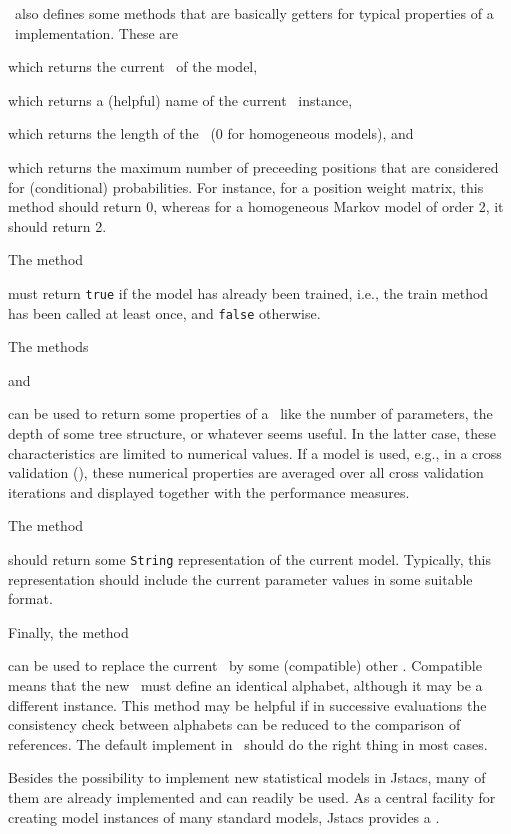 \TrainSM~also defines some methods that are basically getters for typical properties of a \TrainSM~implementation. 
These are
\addtocounter{off}{10}
which returns the current \AlphabetContainer~of the model,
\addtocounter{off}{7}
which returns a (helpful) name of the current \TrainSM~instance,
\addtocounter{off}{10}
which returns the length of the \TrainSM~(0 for homogeneous models), and
\addtocounter{off}{10}
which returns the maximum number of preceeding positions that are considered for (conditional) probabilities.
For instance, for a position weight matrix, this method should return 0, whereas for a homogeneous Markov model of order 2, it should return 2.

The method
\addtocounter{off}{9}
must return \lstinline+true+ if the model has already been trained, i.e., the train method has been called at least once, and \lstinline+false+ otherwise.

The methods
\addtocounter{off}{17}
and
\addtocounter{off}{12}
can be used to return some  properties of a \TrainSM~like the number of parameters, the depth of some tree structure, or whatever seems useful. In the latter case, these characteristics are limited to numerical values. If a model is used, e.g., in a cross validation (\KFoldCrossValidation), these numerical properties are averaged over all cross validation iterations and displayed together with the performance measures.

The method
\addtocounter{off}{8}
should return some \lstinline+String+ representation of the current model. Typically, this representation should include the current parameter values in some suitable format.

Finally, the method
\addtocounter{off}{20}
can be used to replace the current \AlphabetContainer~by some (compatible) other \AlphabetContainer.
Compatible means that the new \AlphabetContainer~must define an identical alphabet, although it may be a different instance. This method may be helpful if in successive evaluations the consistency check between alphabets can be reduced to the comparison of references. The default implement in \AbstractTrainSM~should do the right thing in most cases.

\renewcommand{\codefile}{../codeExamples/NewCodeExampleTest.java}

Besides the possibility to implement new statistical models in Jstacs, many of them are already implemented and can readily be used.
As a central facility for creating model instances of many standard models, Jstacs provides a \TrainSMFactory.

